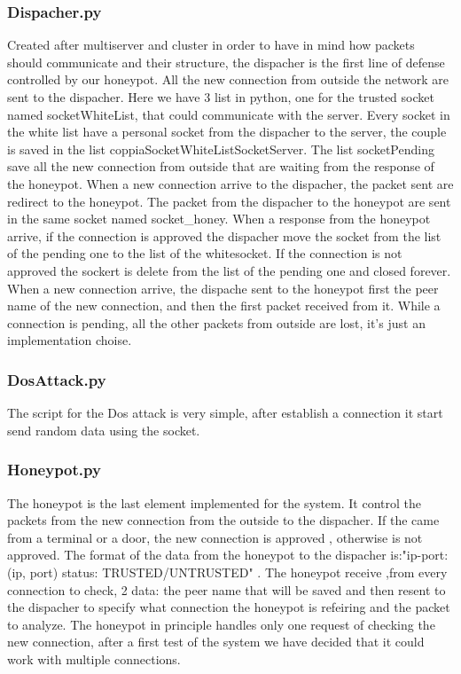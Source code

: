 \subsubsection{Dispacher.py}
Created after multiserver and cluster in order to have in mind how packets should communicate and their structure, the dispacher is the first line of defense controlled by our honeypot. All the new connection from outside the network are sent to the dispacher. Here we have 3 list in python, one for the trusted socket named socketWhiteList, that could communicate with the server. Every socket in the white list have a personal socket from the dispacher to the server, the couple is saved in the list coppiaSocketWhiteListSocketServer. The list socketPending save all the new connection from outside that are waiting from the response of the honeypot. When a new connection arrive to the dispacher, the packet sent are redirect to the honeypot. The packet from the dispacher to the honeypot are sent in the same socket named socket\_honey. When a response from the honeypot arrive, if the connection is approved the dispacher move the socket from the list of the pending one to the list of the whitesocket. If the connection is not approved the sockert is delete from the list of the pending one and closed forever.  When a new connection arrive, the dispache sent to the honeypot first the peer name of the new connection, and then the first packet received from it. While a connection is pending, all the other packets from outside are lost, it's just an implementation choise.

\subsubsection{DosAttack.py}
The script for the Dos attack is very simple,  after establish a connection it start send random data using the socket. 


\subsubsection{Honeypot.py}
The honeypot is the last element implemented for the system. It control the packets from the new connection from the outside to the dispacher. If the came from a terminal or a door, the new connection is approved , otherwise is not approved. The format of the data from the honeypot to the dispacher is:"ip-port: (ip, port) status: TRUSTED/UNTRUSTED" . The honeypot receive ,from every connection to check, 2 data: the peer name that will be saved and then resent to the dispacher to specify what connection the honeypot is refeiring and the packet to analyze. 
The honeypot in principle handles only one request of checking the new connection, after a first test of the system we have decided that it could work with multiple connections.


